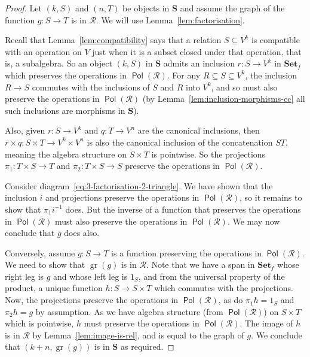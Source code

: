 \documentclass[11pt, a4paper, twoside,leqno]{amsart}
\def\blue{\leavevmode\color{blue}}%
\newcommand{\cat}[1]{\mathbf{#1}}
\newcommand{\cd}[2][]{\vcenter{\hbox{\xymatrix#1{#2}}}}
\numberwithin{equation}{section}
\theoremstyle{plain}
\theoremstyle{definition}
\DeclareMathOperator{\Pol}{\mathsf{Pol}}
\DeclareMathOperator{\gr}{gr}
\begin{document}
\begin{proof}
  Let \((k,S)\) and \((n,T)\) be objects in \(\cat{S}\) and assume the
  graph of the function \(g \colon S \rightarrow T\) is in \(\mathscr{R}\). We will
  use Lemma~\ref{lem:factorisation}.

  
  Recall that Lemma~\ref{lem:compatibility} says that a relation
  \(S \subseteq V^{k}
  \) is
  compatible with an operation on \(V\) just when it is a subset
  closed under that operation, that is, a subalgebra. So an object
  \((k,S)\) 
  in \(\cat{S}\) admits an inclusion \(r \colon S \rightarrow V^{k}\)
  in \(\cat{Set}_{f}\) which preserves the operations in \(\Pol(\mathscr{R}
  )\). For any \(R \subseteq S  \subseteq V^{k}
  \), the inclusion \(R \rightarrow S
  \) commutes with the inclusions
  of \(S\) and \(R\) into \(V^{k}\), and so must also preserve the
  operations in \(\Pol(\mathscr{R}
  )\) (by Lemma~\ref{lem:inclusion-morphisms-cc} all such inclusions are
  morphisms in \(\cat{S}\)).
  
  
  Also, given \(r \colon S \rightarrow V^{k}\) and \(q \colon T
  \rightarrow V^{n}\) are the canonical inclusions, then \(r\times q \colon S
  \times T  \rightarrow V^{k} \times V^{n} \) is also the canonical
  inclusion of the concatenation \(ST\), meaning the algebra structure on
  \(S \times T\) is pointwise. So the projections \(\pi_{1} \colon T
  \times S \rightarrow T\) and 
  \(\pi_{2} \colon T \times S \rightarrow S\) preserve the operations in \(\Pol(\mathscr{R}
  )\).

  Consider diagram~\eqref{eq:3-factorisation-2-triangle}. We have shown that
  the inclusion \(i\) and projections preserve the operations in \(\Pol(\mathscr{R}
  )\), so it remains to show that \(\pi_{1}i^{-1}\) does. But the
  inverse of a function that preserves the operations in \(\Pol(\mathscr{R}
  )\) must also
  preserve the operations in \(\Pol(\mathscr{R}
  )\). We may now conclude that \(g\) does also.
  \smallskip

  
  Conversely, assume \(g \colon S \rightarrow T\) is a function
  preserving the operations in \(\Pol(\mathscr{R})\). We need to
  show that \(\gr(g)\) is in \(\mathscr{R}\). Note that we have a span in
  \(\cat{Set}_{f}\) whose right leg is \(g\) and whose
  left leg is \(1_{S}\), and from the universal property of the
  product, a unique function \(h \colon S \rightarrow S \times T\)
  which commutes with the projections. Now, the projections preserve
  the operations in \(\Pol(\mathscr{R})\), as do  \(\pi_{1}h = 1_{S}\)
  and \(\pi_{2}h = g\) by assumption. As we have algebra structure (from
  \(\Pol(\mathscr{R})\)) on \(S \times
  T\) which is pointwise, \(h\) must preserve the
  operations in \(\Pol(\mathscr{R})\). The image of \(h\) is in
  \(\mathscr{R}\) by Lemma~\ref{lem:image-is-rel}, and is equal to the
  graph of \(g\). We conclude that \((k+n,\gr(g))\) is in \(\cat{S}\) as required.
\end{proof}
\end{document}

